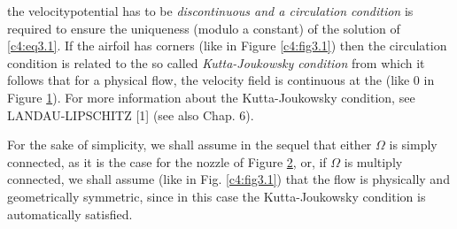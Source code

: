 \begin{figure}[H]
\caption{}\label{c4:fig3.2}
\end{figure}

\noindent the velocity\pageoriginale  potential has to be \textit{discontinuous
  and a circulation condition} is required to ensure the uniqueness
(modulo a constant) of the solution of \eqref{c4:eq3.1}. If the
airfoil has corners (like in Figure \ref{c4:fig3.1}) then the circulation
condition is related to the so called \textit{Kutta-Joukowsky
  condition} from which it follows that for a physical flow, the
velocity field is continuous at the (like 0 in Figure
\ref{c4:fig3.2}). For more information about the Kutta-Joukowsky condition, see
LANDAU-LIPSCHITZ [1] (see also Chap. 6). 

For the sake of simplicity, we shall assume in the sequel that either
$\Omega$ is simply connected, as it is the case for the nozzle of
Figure \ref{c4:fig3.3}, or, if $\Omega$ is multiply connected, we shall assume
(like in Fig. \ref{c4:fig3.1}) that the flow is physically and geometrically
symmetric, since in this case the Kutta-Joukowsky condition is
automatically satisfied. 

\begin{figure}[H]
\caption{}\label{c4:fig3.3}
\end{figure}


